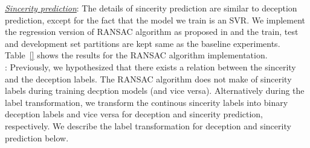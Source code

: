 \documentclass{article}
\begin{document}
\noindent\underline{\it Sincerity prediction}: 
The details of sincerity prediction are similar to deception prediction, except for the fact that the model we train is an SVR.
We implement the regression version of RANSAC algorithm as proposed in \cite{} and the train, test and development set partitions are kept same as the baseline experiments.
Table~\ref{} shows the results for the RANSAC algorithm implementation.
\\

:
Previously, we hypothesized that there exists a relation between the sincerity and the deception labels.
The RANSAC algorithm does not make of sincerity labels during training decption models (and vice versa). 
Alternatively during the label transformation, we transform the continous sincerity labels into binary deception labels and vice versa for deception and sincerity prediction, respectively.
We describe the label transformation for deception and sincerity prediction below.
\\
\end{document}
